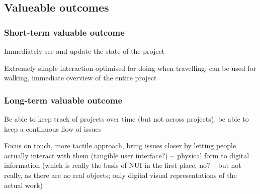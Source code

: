 \subsection{Valueable outcomes}

\subsubsection{Short-term valuable outcome}

Immediately see and update the state of the project

Extremely simple interaction optimised for doing when travelling, can be used for walking, immediate overview of the entire project

\subsubsection{Long-term valuable outcome}

Be able to keep track of projects over time (but not across projects), be able to keep a continuous flow of issues %

Focus on touch, more tactile approach, bring issues closer by letting people actually interact with them (tangible user interface?) – physical form to digital information (which is really the basis of NUI in the first place, no? – but not really, as there are no real objects; only digital visual representations of the actual work)
